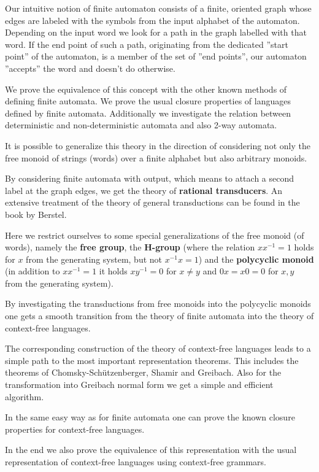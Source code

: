Our intuitive notion of finite automaton consists of a finite, oriented graph whose 
edges are labeled with the symbols from the input alphabet of the automaton. 
Depending on the input word we look for a path in the graph labelled with that
word. If the end point of such a path, originating from the dedicated ''start point'' 
of the automaton, is a member of the set of ''end points'', our automaton
''accepts'' the word and doesn't do otherwise.

We prove the equivalence of this concept with the other known methods of
defining finite automata. We prove the usual closure properties of languages
defined by finite automata. Additionally we investigate the relation between
deterministic and non-deterministic automata and also 2-way automata.

It is possible to generalize this theory in the direction of considering not
only the free monoid of strings (words) over a finite alphabet but also
arbitrary monoids.

By considering finite automata with output, which means to attach a second label
at the graph edges, we get the theory of {\bf rational transducers}. An
extensive treatment of the theory of general transductions can be found in the book by
Berstel.

Here we restrict ourselves to some special generalizations of the free monoid
(of words), namely the {\bf free group}, the {\bf H-group} (where the relation
$x x^{-1} = 1$ holds for $x$ from the generating system, but not $x^{-1} x = 1$) and the
{\bf polycyclic monoid} (in addition to $x x^{-1} = 1$ it holds $x y^{-1} = 0$
for $x \neq y$ and $0 x = x 0 = 0$ for $x,y$ from the generating system).

By investigating the transductions from free monoids into the polycyclic
monoids one gets a smooth transition from the theory of finite automata into the
theory of context-free languages.

The corresponding construction of the theory of context-free languages leads to
a simple path to the most important representation theorems. This includes the
theorems of Chomsky-Schützenberger, Shamir and Greibach. Also for the
transformation into Greibach normal form we get a simple and efficient
algorithm.

In the same easy way as for finite automata one can prove the known closure
properties for context-free languages.

In the end we also prove the equivalence of this representation with the usual
representation of context-free languages using context-free grammars.

